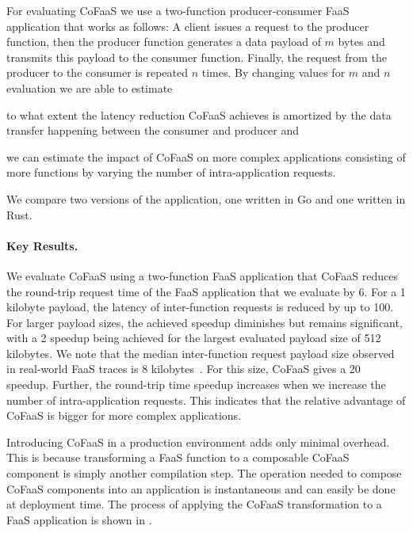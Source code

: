 \documentclass[../main.tex]{subfiles}
\begin{document}
\begin{refsection}
For evaluating CoFaaS we use a two-function producer-consumer FaaS
application that works as follows: A client issues a request to the
producer function, then the producer function generates a data payload
of $m$ bytes and transmits this payload to the consumer
function. Finally, the request from the producer to the consumer is
repeated $n$ times. By changing values for $m$ and $n$ evaluation we
are able to estimate \begin{inparaenum}[a)]
\item to what extent the latency reduction CoFaaS achieves is
  amortized by the data transfer happening between the consumer and
  producer and \item we can estimate the impact of CoFaaS on more
  complex applications consisting of more functions by varying the
  number of intra-application requests.
\end{inparaenum} We compare two versions of the application, one written in Go and one written in Rust.


\paragraph{Key Results.}
We evaluate CoFaaS using a two-function FaaS application that CoFaaS
reduces the round-trip request time of the FaaS application that we
evaluate by 6\texttimes. For a 1 kilobyte payload, the latency of
inter-function requests is reduced by up to 100\texttimes. For larger
payload sizes, the achieved speedup diminishes but remains
significant, with a 2\texttimes{} speedup being achieved for the largest
evaluated payload size of 512 kilobytes. We note that the median
inter-function request payload size observed in real-world FaaS traces
is 8 kilobytes~\cite{mahgoub22_wisef}. For this size, CoFaaS gives a
20\texttimes{} speedup. Further, the round-trip time speedup increases
when we increase the number of intra-application requests. This
indicates that the relative advantage of CoFaaS is bigger for more
complex applications.

Introducing CoFaaS in a production environment adds only minimal
overhead. This is because transforming a FaaS function to a composable
CoFaaS component is simply another compilation step. The operation
needed to compose CoFaaS components into an application is
instantaneous and can easily be done at deployment time. The process
of applying the CoFaaS transformation to a FaaS application is shown
in .


\ifx\chapincluded\undefined
  \printbibliography
  \end{refsection}
 \fi
\end{document}

